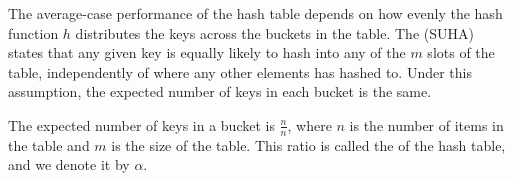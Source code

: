 The average-case performance of the hash table depends on how evenly the hash function $h$ distributes the keys across the buckets in the table. The (SUHA) states that any given key is equally likely to hash into any of the $m$ slots of the table, independently of where any other elements has hashed to. Under this assumption, the expected number of keys in each bucket is the same. 

The expected number of keys in a bucket is $\frac{n}{n}$, where $n$ is the number of items in the table and $m$ is the size of the table. This ratio is called the  of the hash table, and we denote it by $\alpha$.